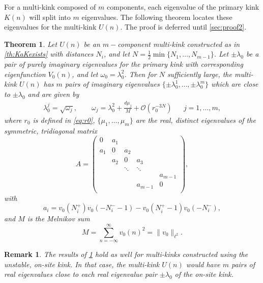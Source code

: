 \documentclass[12pt,reqno]{amsart}
\newtheorem{theorem}{Theorem}
\newtheorem{remark}{Remark}
\begin{document}
For a multi-kink composed of $m$ components, each eigenvalue of the primary kink $K(n)$ will split into $m$ eigenvalues. The following theorem locates these eigenvalues for the multi-kink $U(n)$. The proof is deferred until \cref{sec:proof2}.

\begin{theorem}\label{th:stability}
Let $U(n)$ be an $m-$component multi-kink constructed as in \cref{th:KaKexists} with distances $N_i$, and let $N = \frac{1}{2} \min\{ N_1, \dots, N_{m-1}\}$. Let $\pm \lambda_0$ be a pair of purely imaginary eigenvalues for the primary kink with corresponding eigenfunction $V_0(n)$, and let $\omega_0 = \lambda_0^2$. Then for $N$ sufficiently large, the multi-kink $U(n)$ has $m$ pairs of imaginary eigenvalues $\{\pm \lambda_0^1, \dots, \pm \lambda_0^m \}$ which are close to $\pm \lambda_0$ and are given by
\begin{align}\label{eq:lambdaj}
	\lambda_0^j = \sqrt{\omega_j}, \qquad
	\omega_j = \lambda_0^2 + \frac{d \mu_j}{M} + \mathcal{O}(r_0^{-3N}) && j = 1, \dots, m,
\end{align}
where $r_0$ is defined in \cref{eq:r0}, $\{ \mu_1, \dots, \mu_m \}$ are the real, distinct eigenvalues of the symmetric, tridiagonal matrix
\begin{equation}\label{eq:matrixA}
	A = \begin{pmatrix}
	0 & a_1 & & & \\
	a_1 & 0 & a_2 \\
	& a_2 & 0 & a_3 \\
	& & \ddots & \ddots & \\
	& & & & a_{m-1}  \\
	& & & a_{m-1} & 0  \\
	\end{pmatrix},
\end{equation}
with 
\begin{equation}\label{eq:ai}
	a_i = v_0(N_i^+)v_0(-N_i^- - 1) - v_0(N_i^+ - 1)v_0(-N_i^-),
\end{equation}
and $M$ is the Melnikov sum
\begin{equation}\label{eq:Minth}
	M = \sum_{n = -\infty}^{\infty} v_0(n)^2 = \| v_0 \|_{\ell^2}.
	\end{equation}
\end{theorem}

\begin{remark}\label{remark:unstablekink}
	The results of \cref{th:stability} hold as well for multi-kinks constructed using the unstable, on-site kink. In that case, the multi-kink $U(n)$ would have $m$ pairs of real eigenvalues close to each real eigenvalue pair $\pm \lambda_0$ of the on-site kink.
\end{remark}
\end{document}

